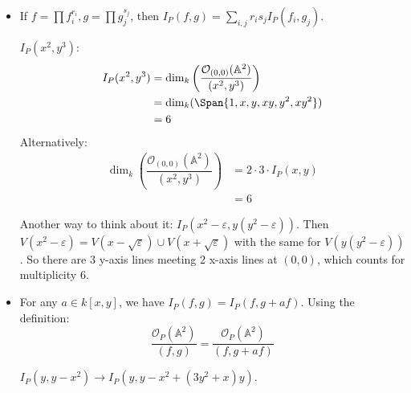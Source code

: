 \documentclass{report}
\begin{document}
\begin{itemize}
        \item If $f = \prod f_{i}^{r_{i}}, g = \prod g_{j}^{s_{j}}$, then $I_{P}(f, g) = \sum_{i, j}r_{i}s_{j}I_{P}(f_{i}, g_{j})$.
            \begin{examples}
                \begin{example}
                    $I_{P}(x^{2}, y^{3})$:
                        \begin{align*}
                            I_{P}(x^{2}, y^{3}) &= \dim_{k}\left(\dfrac{\mathcal{O}_{(0, 0)}(\mathbb{A}^{2})}{(x^{2}, y^{3})}\right) \\
                                                &= \dim_{k}(\Span{1, x, y, xy, y^{2}, xy^{2}})                                     \\
                                                &= 6                                                                                   
                        \end{align*}
                    Alternatively:
                        \begin{align*}
                            \dim_{k}\left(\dfrac{\mathcal{O}_{(0, 0)}(\mathbb{A}^{2})}{(x^{2}, y^{3})}\right) &= 2 \cdot 3 \cdot I_{P}(x, y) \\
                                                                                                              &= 6                             
                        \end{align*}
                \end{example}
                \begin{example}
                    Another way to think about it: $I_{P}(x^{2} - \varepsilon, y(y^{2} - \varepsilon))$. Then $V(x^{2} - \varepsilon) = V(x - \sqrt{\varepsilon}) \cup V(x + \sqrt{\varepsilon})$ with the same for $V(y(y^{2} - \varepsilon))$. So there are $3$ y-axis lines meeting 2 x-axis lines at $(0, 0)$, which counts for multiplicity $6$.
                \end{example}
            \end{examples}

        \item For any $a \in k[x, y]$, we have $I_{P}(f, g) = I_{P}(f, g + af)$. Using the definition:
            \begin{equation*}
                \dfrac{\mathcal{O}_{P}(\mathbb{A}^{2})}{(f, g)} = \dfrac{\mathcal{O}_{P}(\mathbb{A}^{2})}{(f, g + af)}
            \end{equation*}
                \begin{examples}
                    \begin{example}
                        $I_{P}(y, y - x^{2}) \rightarrow I_{P}(y, y - x^{2} + (3y^{2} + x)y)$.
                    \end{example}
                \end{examples}
    \end{itemize}
\end{document}
